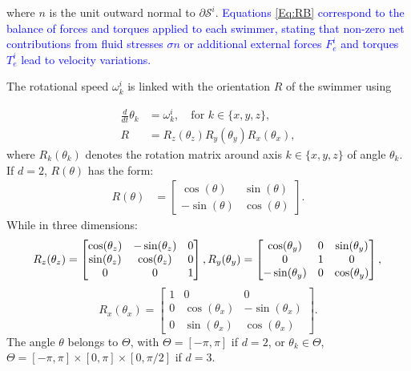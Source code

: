 \documentclass[graybox]{svmult}
\newcommand{\review}[1]{\textcolor{blue}{#1}}
\newcommand{\angvel}{\omega} %
\newcommand{\Rmat}{R} %
\newcommand{\Angle}{\theta}
\newcommand{\Solid}{\mathcal{S}} %
\newcommand{\normal}{n} %
\begin{document}
where $\normal$ is the unit outward normal to $\partial \Solid^i$. \review{Equations \eqref{Eq:RB} correspond to the balance of forces and torques applied to each swimmer, stating that non-zero net contributions from fluid stresses $\sigma n$ or additional external forces $F_e^i$ and torques $T_e^i$ lead to velocity variations.}



The rotational speed $\angvel^i_k$ is linked with the orientation $R$ of the swimmer using

\begin{equation*}
	\begin{aligned}
		\frac{d}{dt} \Angle_k &= \angvel^i_k, \quad \text{for $k \in \{x,y,z\}$},\\
		\Rmat &=\Rmat_z(\Angle_z)\Rmat_y(\Angle_y)\Rmat_x(\Angle_x),
	\end{aligned}
\end{equation*}
where $R_k(\Angle_k)$ denotes the rotation matrix around axis $k \in \{x,y,z\}$ of 
angle $\Angle_k$. If $d=2$, $R(\theta)$ has the form: 
\begin{equation*}
	\begin{aligned}
		\Rmat(\Angle) &= \begin{bmatrix}
			\cos(\Angle) & \sin(\Angle)\\
			-\sin(\Angle) & \cos(\Angle)
		\end{bmatrix}.
	\end{aligned}
\end{equation*}
While in three dimensions:
$$	
	\Rmat_z(\Angle_z) = \begin{bmatrix}
		\cos(\Angle_z) & -\sin(\Angle_z) & 0\\
		\sin(\Angle_z) & \cos(\Angle_z)& 0 \\
		0& 0 & 1
	\end{bmatrix},
	\Rmat_y(\Angle_y) = \begin{bmatrix}
		\cos(\Angle_y) &0 & \sin(\Angle_y) \\
		0& 1& 0\\
		-\sin(\Angle_y) & 0& \cos(\Angle_y)
	\end{bmatrix},\\
$$
$$
	\Rmat_x(\Angle_x) = \begin{bmatrix}
		1 & 0 & 0\\
		0 &\cos(\Angle_x) & -\sin(\Angle_x) \\
		0 &\sin(\Angle_x) & \cos(\Angle_x) 
	\end{bmatrix}.
$$
The angle $\Angle$ belongs to  $\Theta$, with $\Theta = [-\pi,\pi]$ if $d=2$, 
or $\Angle_k \in \Theta$, $\Theta=[-\pi,\pi]\times[0,\pi]\times[0,\pi/2]$ if $d=3$.
\end{document}
